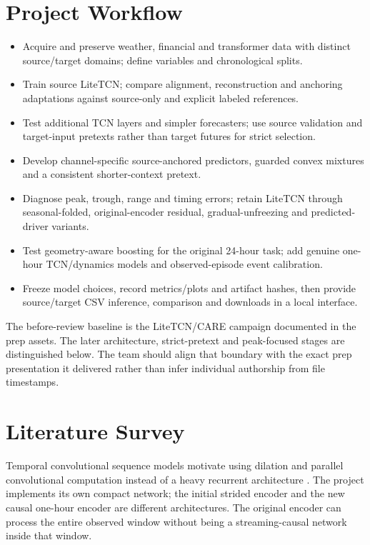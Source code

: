 \section{Project Workflow}
\begin{itemize}
\item Acquire and preserve weather, financial and transformer data with distinct source/target domains; define variables and chronological splits.
\item Train source LiteTCN; compare alignment, reconstruction and anchoring adaptations against source-only and explicit labeled references.
\item Test additional TCN layers and simpler forecasters; use source validation and target-input pretexts rather than target futures for strict selection.
\item Develop channel-specific source-anchored predictors, guarded convex mixtures and a consistent shorter-context pretext.
\item Diagnose peak, trough, range and timing errors; retain LiteTCN through seasonal-folded, original-encoder residual, gradual-unfreezing and predicted-driver variants.
\item Test geometry-aware boosting for the original 24-hour task; add genuine one-hour TCN/dynamics models and observed-episode event calibration.
\item Freeze model choices, record metrics/plots and artifact hashes, then provide source/target CSV inference, comparison and downloads in a local interface.
\end{itemize}
The before-review baseline is the LiteTCN/CARE campaign documented in the prep assets. The later architecture, strict-pretext and peak-focused stages are distinguished below. The team should align that boundary with the exact prep presentation it delivered rather than infer individual authorship from file timestamps.

\section{Literature Survey}\label{sec:litsurvey}
Temporal convolutional sequence models motivate using dilation and parallel convolutional computation instead of a heavy recurrent architecture \citep{Bai18}. The project implements its own compact network; the initial strided encoder and the new causal one-hour encoder are different architectures. The original encoder can process the entire observed window without being a streaming-causal network inside that window.

